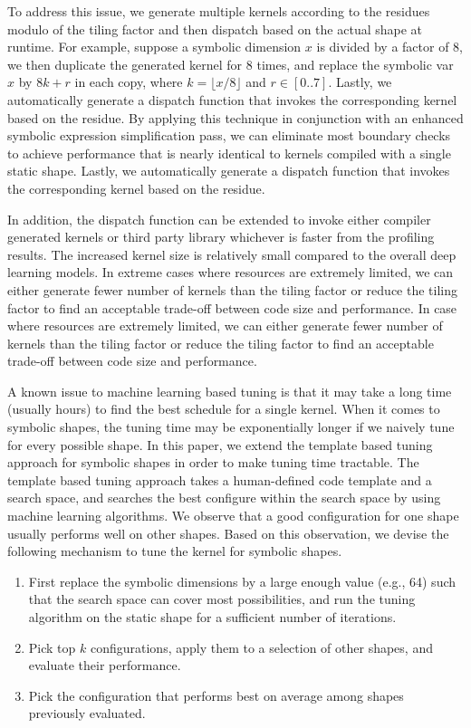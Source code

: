 To address this issue, we generate multiple kernels according to the residues modulo of the tiling
  factor and then dispatch based on the actual shape at runtime.
For example, suppose a symbolic dimension $x$ is divided by a factor of 8, we then duplicate the generated kernel
  for 8 times, and replace the symbolic var $x$ by $8k+r$ in each copy, where $k = \lfloor x / 8 \rfloor$ and $r \in [0..7]$.
Lastly, we automatically generate a dispatch function that invokes the corresponding kernel based on the residue.
By applying this technique in conjunction with an enhanced symbolic expression simplification pass,
  we can eliminate most boundary checks to achieve performance that is nearly identical
  to kernels compiled with a single static shape.
Lastly, we automatically generate a dispatch function that invokes the corresponding kernel based on the residue.


In addition, the dispatch function can be extended to invoke either compiler generated kernels
  or third party library whichever is faster from the profiling results.
The increased kernel size is relatively small compared to the overall deep learning models.
In extreme cases where resources are extremely limited,
  we can either generate fewer number of kernels than the tiling factor
  or reduce the tiling factor to find an acceptable trade-off
  between code size and performance.
In case where resources are extremely limited, we can either generate fewer number of kernels
than the tiling factor or reduce the tiling factor to find an acceptable trade-off between code size and performance.

A known issue to machine learning based tuning is that it may take a long time (usually hours) to find
  the best schedule for a single kernel.
When it comes to symbolic shapes, the tuning time may be exponentially longer if we
  naively tune for every possible shape.
In this paper, we extend the template based tuning approach for
  symbolic shapes in order to make tuning time tractable.
The template based tuning approach takes a human-defined
  code template and a search space, and searches the best configure
  within the search space by using machine learning algorithms.
We observe that a good configuration for one shape usually performs
  well on other shapes.
Based on this observation, we devise the following mechanism
  to tune the kernel for symbolic shapes.

\begin{enumerate}
    \item First replace the symbolic dimensions by a large enough value (e.g., 64) such that the search space can cover most possibilities, and run the tuning algorithm on the static shape for a sufficient number of iterations.
    \item Pick top $k$ configurations, apply them to a selection of other shapes, and evaluate their performance.
    \item Pick the configuration that performs best on average among shapes previously evaluated.
\end{enumerate}

